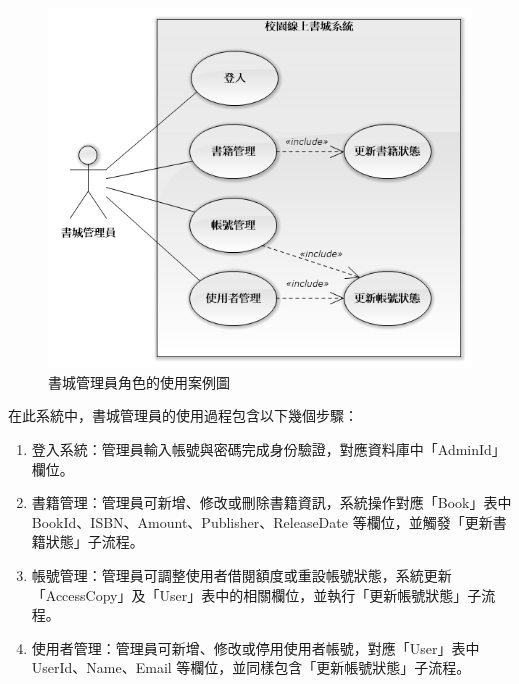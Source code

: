 \begin{figure}[ht]
    \centering
    \includegraphics[width=\linewidth]{image/使用案例：書城管理員.png}
    \captionsetup{justification=centering}
    \caption{書城管理員角色的使用案例圖}
\end{figure}

在此系統中，書城管理員的使用過程包含以下幾個步驟：
\begin{enumerate}
    \item 登入系統：管理員輸入帳號與密碼完成身份驗證，對應資料庫中「AdminId」欄位。
    \item 書籍管理：管理員可新增、修改或刪除書籍資訊，系統操作對應「Book」表中 BookId、ISBN、Amount、Publisher、ReleaseDate 等欄位，並觸發「更新書籍狀態」子流程。
    \item 帳號管理：管理員可調整使用者借閱額度或重設帳號狀態，系統更新「AccessCopy」及「User」表中的相關欄位，並執行「更新帳號狀態」子流程。
    \item 使用者管理：管理員可新增、修改或停用使用者帳號，對應「User」表中 UserId、Name、Email 等欄位，並同樣包含「更新帳號狀態」子流程。
\end{enumerate}
